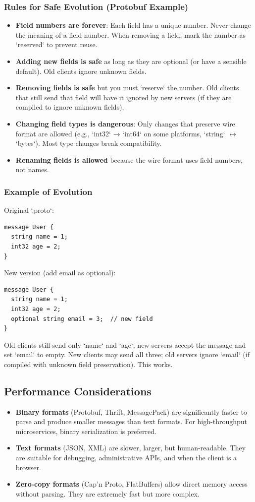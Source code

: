 \documentclass[10pt,a4paper]{article}
\begin{document}
\subsubsection{Rules for Safe Evolution (Protobuf Example)}
\begin{itemize}
    \item \textbf{Field numbers are forever}: Each field has a unique number. Never change the meaning of a field number. When removing a field, mark the number as `reserved` to prevent reuse.
    \item \textbf{Adding new fields is safe} as long as they are optional (or have a sensible default). Old clients ignore unknown fields.
    \item \textbf{Removing fields is safe} but you must `reserve` the number. Old clients that still send that field will have it ignored by new servers (if they are compiled to ignore unknown fields).
    \item \textbf{Changing field types is dangerous}: Only changes that preserve wire format are allowed (e.g., `int32` → `int64` on some platforms, `string` $\leftrightarrow$ `bytes`). Most type changes break compatibility.
    \item \textbf{Renaming fields is allowed} because the wire format uses field numbers, not names.
\end{itemize}

\subsubsection{Example of Evolution}
Original `.proto`:
\begin{lstlisting}
message User {
  string name = 1;
  int32 age = 2;
}
\end{lstlisting}
New version (add email as optional):
\begin{lstlisting}
message User {
  string name = 1;
  int32 age = 2;
  optional string email = 3;  // new field
}
\end{lstlisting}
Old clients still send only `name` and `age`; new servers accept the message and set `email` to empty. New clients may send all three; old servers ignore `email` (if compiled with unknown field preservation). This works.

\subsection{Performance Considerations}
\begin{itemize}
    \item \textbf{Binary formats} (Protobuf, Thrift, MessagePack) are significantly faster to parse and produce smaller messages than text formats. For high-throughput microservices, binary serialization is preferred.
    \item \textbf{Text formats} (JSON, XML) are slower, larger, but human-readable. They are suitable for debugging, administrative APIs, and when the client is a browser.
    \item \textbf{Zero-copy formats} (Cap’n Proto, FlatBuffers) allow direct memory access without parsing. They are extremely fast but more complex.
\end{itemize}
\end{document}
